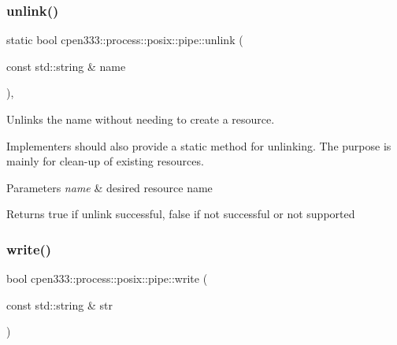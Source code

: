 \mbox{\label{classcpen333_1_1process_1_1posix_1_1pipe_aef89e04134417c569972bd565741622b}} 
\subsubsection{\texorpdfstring{unlink()}{unlink()}\hspace{0.1cm}{\footnotesize\ttfamily [2/2]}}
{\footnotesize\ttfamily static bool cpen333\+::process\+::posix\+::pipe\+::unlink (\begin{DoxyParamCaption}\item[{const std\+::string \&}]{name }\end{DoxyParamCaption})\hspace{0.3cm}{\ttfamily [inline]}, {\ttfamily [static]}}



Unlinks the name without needing to create a resource. 

Implementers should also provide a static method for unlinking. The purpose is mainly for clean-\/up of existing resources.


\begin{DoxyParams}{Parameters}
{\em name} & desired resource name \\
\hline
\end{DoxyParams}
\begin{DoxyReturn}{Returns}
{\ttfamily true} if unlink successful, {\ttfamily false} if not successful or not supported 
\end{DoxyReturn}
\mbox{\label{classcpen333_1_1process_1_1posix_1_1pipe_a6aeb644645944b435c32928db1349aa7}} 
\subsubsection{\texorpdfstring{write()}{write()}\hspace{0.1cm}{\footnotesize\ttfamily [1/2]}}
{\footnotesize\ttfamily bool cpen333\+::process\+::posix\+::pipe\+::write (\begin{DoxyParamCaption}\item[{const std\+::string \&}]{str }\end{DoxyParamCaption})\hspace{0.3cm}{\ttfamily [inline]}}



